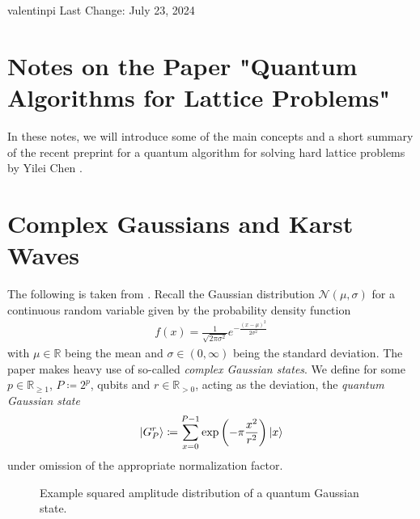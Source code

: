 \documentclass[10pt]{amsart}
\theoremstyle{definition}
\theoremstyle{remark}
\begin{document}
    valentinpi \hfill Last Change: July 23, 2024

    \section*{Notes on the Paper "Quantum Algorithms for Lattice Problems"} 

    \phantom{}

    In these notes, we will introduce some of the main concepts and a short summary of the recent preprint for a quantum algorithm for solving hard lattice problems by Yilei Chen \cite{Chen2024}.

    \section{Complex Gaussians and Karst Waves}

    The following is taken from \cite[pp. 3-4]{Chen2024}. Recall the Gaussian distribution \(\mathcal{N}(\mu, \sigma)\) for a continuous random variable given by the probability density function
    \begin{align}
        f(x) = \frac{1}{\sqrt{2\pi\sigma^2}} e^{-\frac{(x-\mu)^2}{2\sigma^2}}
    \end{align}
    with \(\mu \in \mathbb{R}\) being the mean and \(\sigma \in (0, \infty)\) being the standard deviation. The paper makes heavy use of so-called \emph{complex Gaussian states}. We define for some \(p \in \mathbb{R}_{\geq 1}\), \(P \coloneqq 2^p\), qubits and \(r \in \mathbb{R}_{> 0}\), acting as the deviation, the \emph{quantum Gaussian state}
    \begin{align}
        \ket{G_P^r} \coloneqq \sum_{x=0}^{P-1} \exp\left(-\pi\frac{x^2}{r^2}\right) \ket{x}
    \end{align}
    under omission of the appropriate normalization factor.

    \begin{figure}[!hbtp]
        \centering
        \caption{Example squared amplitude distribution of a quantum Gaussian state.}
        \label{example_real_gaussian_state}
    \end{figure}
    
\end{document}
